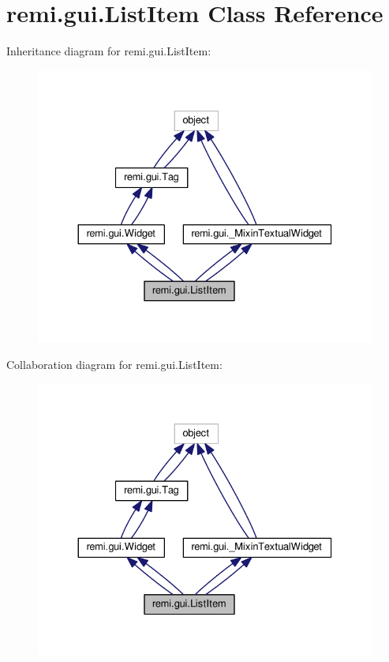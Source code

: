 \hypertarget{classremi_1_1gui_1_1ListItem}{}\section{remi.\+gui.\+List\+Item Class Reference}
\label{classremi_1_1gui_1_1ListItem}


Inheritance diagram for remi.\+gui.\+List\+Item\+:
\nopagebreak
\begin{figure}[H]
\begin{center}
\leavevmode
\includegraphics[width=330pt]{d5/d64/classremi_1_1gui_1_1ListItem__inherit__graph}
\end{center}
\end{figure}


Collaboration diagram for remi.\+gui.\+List\+Item\+:
\nopagebreak
\begin{figure}[H]
\begin{center}
\leavevmode
\includegraphics[width=330pt]{d0/d5e/classremi_1_1gui_1_1ListItem__coll__graph}
\end{center}
\end{figure}
